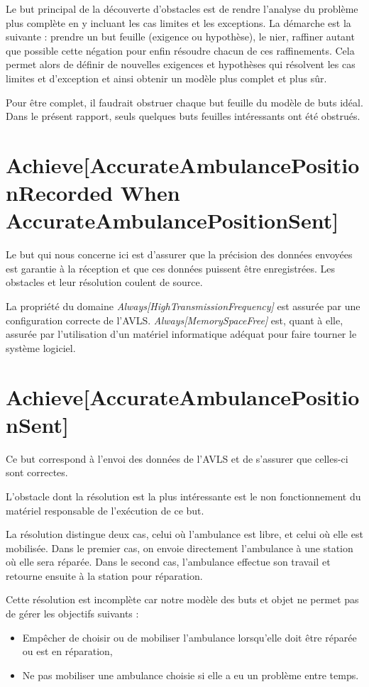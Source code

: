 Le but principal de la découverte d'obstacles est de rendre l'analyse du 
problème plus complète en y incluant les cas limites et les exceptions.  La 
démarche est la suivante : prendre un but feuille (exigence ou hypothèse), 
le nier, raffiner autant que possible cette négation pour enfin résoudre chacun 
de ces raffinements.  Cela permet alors de définir de nouvelles exigences et 
hypothèses qui résolvent les cas limites et d'exception et ainsi obtenir un 
modèle plus complet et plus sûr.

Pour être complet, il faudrait obstruer chaque but feuille du modèle de buts 
idéal.  Dans le présent rapport, seuls quelques buts feuilles intéressants ont 
été obstrués.

\section{Achieve[AccurateAmbulancePositionRecorded When AccurateAmbulancePositionSent]}
	Le but qui nous concerne ici est d'assurer que la précision des
	données envoyées est garantie à la réception et que ces données
	puissent être enregistrées. Les obstacles et leur résolution coulent 
	de source.
	
	La propriété du domaine \emph{Always[HighTransmissionFrequency]} est assurée 
	par une configuration correcte de l'AVLS.  \emph{Always[MemorySpaceFree]} 
	est, quant à elle, assurée par l'utilisation d'un matériel informatique 
	adéquat pour faire tourner le système logiciel. 

\section{Achieve[AccurateAmbulancePositionSent]}
	Ce but correspond à l'envoi des données de l'AVLS et de s'assurer
	que celles-ci sont correctes. 

	L'obstacle dont la résolution est la plus intéressante est le non
	fonctionnement du matériel responsable de l'exécution de ce but.

	La résolution distingue deux cas, celui où l'ambulance est libre, et celui
	où elle est mobilisée. Dans le premier cas, on envoie directement
	l'ambulance à une station où elle sera réparée. Dans le second
	cas, l'ambulance effectue son travail et retourne ensuite à la 
	station pour réparation.

	Cette résolution est incomplète car notre modèle des buts et objet
	ne permet pas de gérer les objectifs suivants : 
	\begin{itemize}
		\item Empêcher de choisir ou de mobiliser l'ambulance lorsqu'elle
		doit être réparée ou est en réparation,
		\item Ne pas mobiliser une ambulance choisie si elle a eu un
		problème entre temps.
	\end{itemize}

